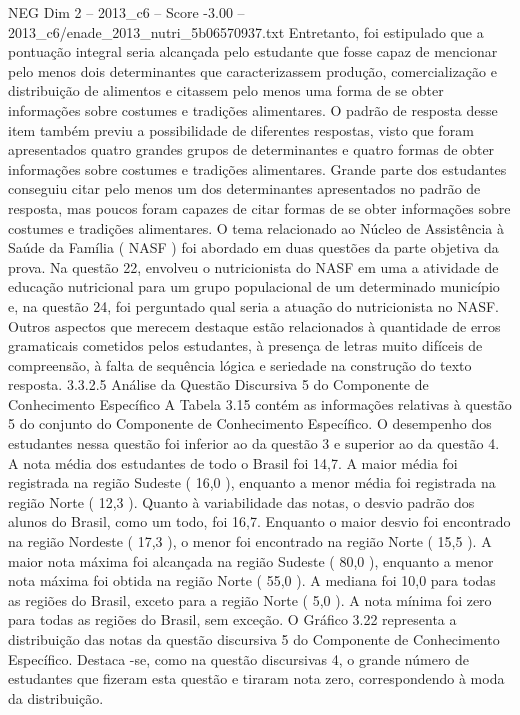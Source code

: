 \begin{textsample}{NEG Dim 2 – 2013\_c6 – Score -3.00 – 2013\_c6/enade\_2013\_nutri\_5b06570937.txt}
Entretanto, foi estipulado que a pontuação integral seria alcançada pelo estudante que fosse capaz de mencionar pelo menos dois determinantes que caracterizassem produção, comercialização e distribuição de alimentos e citassem pelo menos uma forma de se obter informações sobre costumes e tradições alimentares.
O padrão de resposta desse item também previu a possibilidade de diferentes respostas, visto que foram apresentados quatro grandes grupos de determinantes e quatro formas de obter informações sobre costumes e tradições alimentares.
Grande parte dos estudantes conseguiu citar pelo menos um dos determinantes apresentados no padrão de resposta, mas poucos foram capazes de citar formas de se obter informações sobre costumes e tradições alimentares.
O tema relacionado ao Núcleo de Assistência à Saúde da Família ( NASF ) foi abordado em duas questões da parte objetiva da prova.
Na questão 22, envolveu o nutricionista do NASF em uma a atividade de educação nutricional para um grupo populacional de um determinado município e, na questão 24, foi perguntado qual seria a atuação do nutricionista no NASF.
Outros aspectos que merecem destaque estão relacionados à quantidade de erros gramaticais cometidos pelos estudantes, à presença de letras muito difíceis de compreensão, à falta de sequência lógica e seriedade na construção do texto resposta. 3.3.2.5 Análise da Questão Discursiva 5 do Componente de Conhecimento Específico A Tabela 3.15 contém as informações relativas à questão 5 do conjunto do Componente de Conhecimento Específico.
O desempenho dos estudantes nessa questão foi inferior ao da questão 3 e superior ao da questão 4.
A nota média dos estudantes de todo o Brasil foi 14,7.
A maior média foi registrada na região Sudeste ( 16,0 ), enquanto a menor média foi registrada na região Norte ( 12,3 ).
Quanto à variabilidade das notas, o desvio padrão dos alunos do Brasil, como um todo, foi 16,7.
Enquanto o maior desvio foi encontrado na região Nordeste ( 17,3 ), o menor foi encontrado na região Norte ( 15,5 ).
A maior nota máxima foi alcançada na região Sudeste ( 80,0 ), enquanto a menor nota máxima foi obtida na região Norte ( 55,0 ).
A mediana foi 10,0 para todas as regiões do Brasil, exceto para a região Norte ( 5,0 ).
A nota mínima foi zero para todas as regiões do Brasil, sem exceção.
O Gráfico 3.22 representa a distribuição das notas da questão discursiva 5 do Componente de Conhecimento Específico.
Destaca -se, como na questão discursivas 4, o grande número de estudantes que fizeram esta questão e tiraram nota zero, correspondendo à moda da distribuição.

\end{textsample}
